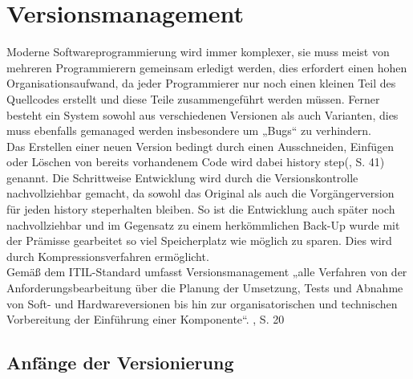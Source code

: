 \chapter{Versionsmanagement}

Moderne Softwareprogrammierung wird immer komplexer, sie muss meist von mehreren Programmierern gemeinsam erledigt werden, dies erfordert einen hohen Organisationsaufwand, da jeder Programmierer nur noch einen kleinen Teil des Quellcodes erstellt und diese Teile zusammengeführt werden müssen. Ferner besteht ein System sowohl aus verschiedenen Versionen als auch Varianten, dies muss ebenfalls gemanaged werden insbesondere um „Bugs“ zu verhindern.
\\
Das Erstellen einer neuen Version bedingt durch einen Ausschneiden, Einfügen oder Löschen von bereits vorhandenem Code wird dabei \Gu history step\Go (\cite{cm_vc}, S. 41) genannt. 
Die Schrittweise Entwicklung wird durch die Versionskontrolle nachvollziehbar gemacht, da sowohl das Original als auch die Vorgängerversion für jeden \Gu history step\Go erhalten bleiben. So ist die Entwicklung auch später noch nachvollziehbar und im Gegensatz zu einem herkömmlichen Back-Up wurde mit der Prämisse gearbeitet so viel Speicherplatz wie möglich zu sparen. Dies wird durch Kompressionsverfahren ermöglicht. \cite{cm_vc}
\\
Gemäß dem ITIL-Standard umfasst Versionsmanagement „alle Verfahren von der Anforderungsbearbeitung über die Planung der Umsetzung, Tests und Abnahme von Soft- und Hardwareversionen bis hin zur organisatorischen und technischen Vorbereitung der Einführung einer Komponente“. \cite{itil_infosec}, S. 20

\section{Anfänge der Versionierung}


